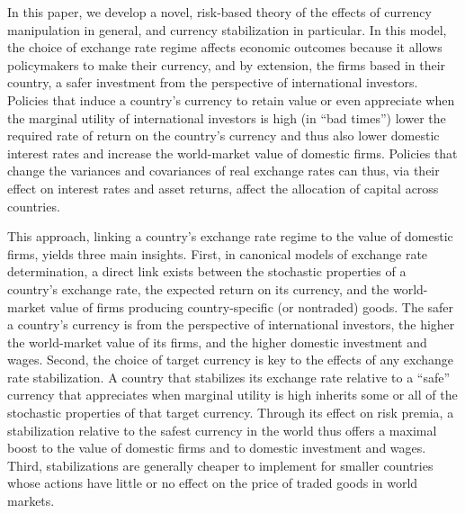 \documentclass[12pt,letter]{article}
\theoremstyle{break} \theorembodyfont{\normalfont\itshape}
\theoremstyle{break}
\theoremstyle{break} \theorembodyfont{\normalfont\itshape}
\theoremstyle{break} \theorembodyfont{\normalfont\itshape}
\begin{document}
In this paper, we develop a novel, risk-based theory of the effects of
currency manipulation in general, and currency stabilization in
particular. In this model, the choice of exchange rate regime affects
economic outcomes because it allows policymakers to make their
currency, and by extension, the firms based in their country, a safer
investment from the perspective of international investors. Policies
that induce a country's currency to retain value or even appreciate
when the marginal utility of international investors is high (in ``bad
times'') lower the required rate of return on the country's currency
and thus also lower domestic interest rates and increase the
world-market value of domestic firms. Policies that change the
variances and covariances of real exchange rates can thus, via their
effect on interest rates and asset returns, affect the allocation of
capital across countries.

This approach, linking a country's exchange rate regime to the value
of domestic firms, yields three main insights. First, in canonical
models of exchange rate determination, a direct link exists between
the stochastic properties of a country's exchange rate, the expected
return on its currency, and the world-market value of firms producing
country-specific (or nontraded) goods. The safer a country's currency
is from the perspective of international investors, the higher the
world-market value of its firms, and the higher domestic investment
and wages. Second, the choice of target currency is key to the effects
of any exchange rate stabilization. A country that stabilizes its
exchange rate relative to a ``safe'' currency that appreciates when
marginal utility is high inherits some or all of the stochastic
properties of that target currency. Through its effect on risk premia,
a stabilization relative to the safest currency in the world thus
offers a maximal boost to the value of domestic firms and to domestic
investment and wages. Third, stabilizations are generally cheaper to
implement for smaller countries whose actions have little or no effect
on the price of traded goods in world markets.
\end{document}

